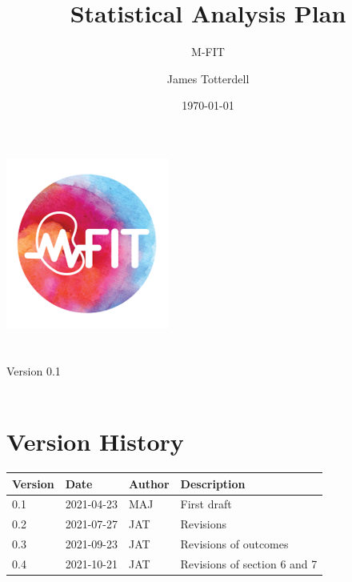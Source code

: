 \documentclass[11pt,parskip=half-]{scrartcl}
\renewcommand{\arraystretch}{1}
\begin{document}
\title{Statistical Analysis Plan}
\subtitle{M-FIT}
\author{James Totterdell}
\date{\today}
\makeatletter
\begin{titlepage}
  \begin{center}
    \includegraphics[width=0.7\linewidth, height=0.4\linewidth]{mfit-logo.png}\\[4ex]
    {\huge \bfseries  \@title }\\[2ex]
    {\LARGE \bfseries  \@subtitle }\\[2ex]
    {\large Version 0.1}\\[2ex]
    {\large \@date}\\[10ex]
  \end{center}
\end{titlepage}
\makeatother
\thispagestyle{empty}
\newpage

\tableofcontents

\section*{Version History}
\label{version-history}


\begin{table}[H]
  \renewcommand{\arraystretch}{1.5}
  \begin{center}
    \begin{tabular}{lllp{5cm}}
      \hline
      Version & Date       & Author & Description                  \\ \hline
      0.1     & 2021-04-23 & MAJ    & First draft                  \\
      0.2     & 2021-07-27 & JAT    & Revisions                    \\
      0.3     & 2021-09-23 & JAT    & Revisions of outcomes        \\
      0.4     & 2021-10-21 & JAT    & Revisions of section 6 and 7 \\
      \hline
    \end{tabular}
  \end{center}
\end{table}
\end{document}

